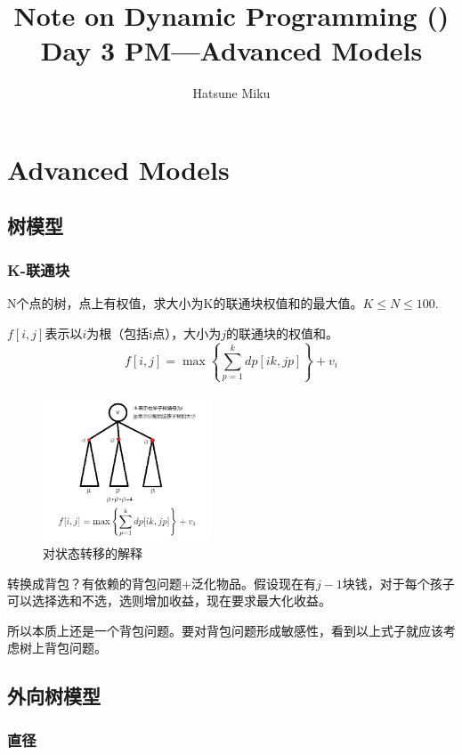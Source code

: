 \documentclass{article}
\newcommand{\romannum}[1]{\uppercase\expandafter{\romannumeral#1}}
\begin{document}
\title{Note on Dynamic Programming (\romannum{3})\\\large{Day 3 PM---Advanced Models}}\date{}\author{Hatsune Miku}
\maketitle
\section{Advanced Models}
\subsection{树模型}
\subsubsection{K-联通块}
N个点的树，点上有权值，求大小为K的联通块权值和的最大值。$K\le N\le 100.$

$f[i,j]$表示以$i$为根（包括i点），大小为$j$的联通块的权值和。
\begin{equation*}
    f[i,j]=\max\left\{\sum_{p=1}^kdp[ik,jp]\right\}+v_i
\end{equation*}
\begin{figure}[h]
    \begin{center}
        \includegraphics[width=5cm]{transtotikz.png}
    \end{center}
    \caption{对状态转移的解释}
    \label{fig. 1.1}
\end{figure}

转换成背包？有依赖的背包问题+泛化物品。假设现在有$j-1$块钱，对于每个孩子可以选择选和不选，选则增加收益，现在要求最大化收益。

所以本质上还是一个背包问题。要对背包问题形成敏感性，看到以上式子就应该考虑树上背包问题。
\subsection{外向树模型}
\subsubsection{直径}
\end{document}
